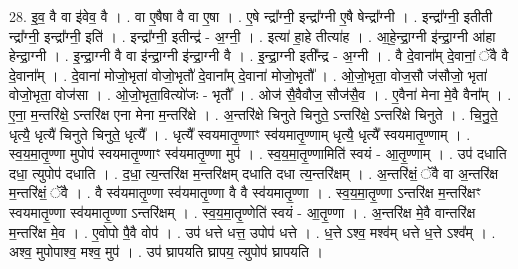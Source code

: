 \documentclass[17pt]{extarticle}
\begin{document}
28. इ॒व॒ वै वा इ॑वेव॒ वै । . वा ए॒षैषा वै वा ए॒षा । . ए॒षे न्द्रा᳚ग्नी॒ इन्द्रा᳚ग्नी ए॒षै षेन्द्रा᳚ग्नी । . इन्द्रा᳚ग्नी॒ इतीती न्द्रा᳚ग्नी॒ इन्द्रा᳚ग्नी॒ इति॑ । . इन्द्रा᳚ग्नी॒ इतीन्द्र॑ - अ॒ग्नी॒ । . इत्या॑ हा॒हे तीत्या॑ह । . आ॒हे॒न्द्रा॒ग्नी इ॑न्द्रा॒ग्नी आ॑हा हेन्द्रा॒ग्नी । . इ॒न्द्रा॒ग्नी वै वा इ॑न्द्रा॒ग्नी इ॑न्द्रा॒ग्नी वै । . इ॒न्द्रा॒ग्नी इती᳚न्द्र - अ॒ग्नी । . वै दे॒वाना᳚म् दे॒वानां॒ ॅवै वै दे॒वाना᳚म् । . दे॒वाना॑ मोजो॒भृता॑ वोजो॒भृतौ॑ दे॒वाना᳚म् दे॒वाना॑ मोजो॒भृतौ᳚ । . ओ॒जो॒भृता॒ वोज॒सौ ज॑सौजो॒ भृता॑ वोजो॒भृता॒ वोज॑सा । . ओ॒जो॒भृता॒वित्यो॑जः - भृतौ᳚ । . ओज॑ सै॒वैवौज॒ सौज॑सै॒व । . ए॒वैना॑ मेना मे॒वै वैना᳚म् । . ए॒ना॒ म॒न्तरि॑क्षे॒ ऽन्तरि॑क्ष एना मेना म॒न्तरि॑क्षे । . अ॒न्तरि॑क्षे चिनुते चिनुते॒ ऽन्तरि॑क्षे॒ ऽन्तरि॑क्षे चिनुते । . चि॒नु॒ते॒ धृत्यै॒ धृत्यै॑ चिनुते चिनुते॒ धृत्यै᳚ । . धृत्यै᳚ स्वयमातृ॒ण्णाꣳ स्व॑यमातृ॒ण्णाम् धृत्यै॒ धृत्यै᳚ स्वयमातृ॒ण्णाम् । . स्व॒य॒मा॒तृ॒ण्णा मुपोप॑ स्वयमातृ॒ण्णाꣳ स्व॑यमातृ॒ण्णा मुप॑ । . स्व॒य॒मा॒तृ॒ण्णामिति॑ स्वयं - आ॒तृ॒ण्णाम् । . उप॑ दधाति दधा॒ त्युपोप॑ दधाति । . द॒धा॒ त्य॒न्तरि॑क्ष म॒न्तरि॑क्षम् दधाति दधा त्य॒न्तरि॑क्षम् । . अ॒न्तरि॑क्षं॒ ॅवै वा अ॒न्तरि॑क्ष म॒न्तरि॑क्षं॒ ॅवै । . वै स्व॑यमातृ॒ण्णा स्व॑यमातृ॒ण्णा वै वै स्व॑यमातृ॒ण्णा । . स्व॒य॒मा॒तृ॒ण्णा ऽन्तरि॑क्ष म॒न्तरि॑क्षꣳ स्वयमातृ॒ण्णा स्व॑यमातृ॒ण्णा ऽन्तरि॑क्षम् । . स्व॒य॒मा॒तृ॒ण्णेति॑ स्वयं - आ॒तृ॒ण्णा । . अ॒न्तरि॑क्ष मे॒वै वान्तरि॑क्ष म॒न्तरि॑क्ष मे॒व । . ए॒वोपो पै॒वै वोप॑ । . उप॑ धत्ते धत्त॒ उपोप॑ धत्ते । . ध॒त्ते ऽश्व॒ मश्व॑म् धत्ते ध॒त्ते ऽश्व᳚म् । . अश्व॒ मुपोपाश्व॒ मश्व॒ मुप॑ । . उप॑ घ्रापयति घ्रापय॒ त्युपोप॑ घ्रापयति । \newline
\end{document}
